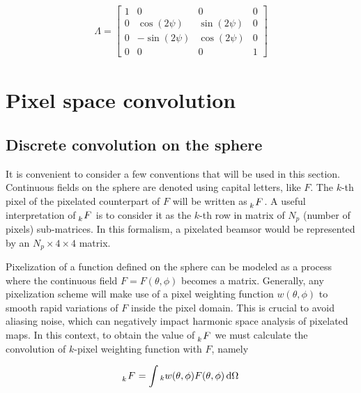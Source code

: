 \documentclass[a4paper,fleqn]{cas-dc}\sloppy
\begin{document}
	\begin{equation}
	\begin{aligned}
	\Lambda =
	\begin{bmatrix}
	1  & 0 & 0 & 0\\
	0  & \cos(2\psi) & \sin(2\psi) & 0\\
	0  &-\sin(2\psi) & \cos(2\psi) & 0\\
	0  & 0 & 0 & 1
	\end{bmatrix}
	\end{aligned}
	\label{eq::lambda_operator}
	\end{equation}
	
	\section{Pixel space convolution}
	\label{sec::pixel_conv}
	
	\subsection{Discrete convolution on the sphere}
	
	It is convenient to consider a few conventions that will be used in this section. Continuous fields on the sphere are denoted using capital letters, like $F$. The $k$-th pixel of the pixelated counterpart of $F$ will be written as $\tensor[_k]{F}{}$. A useful interpretation of $\tensor[_k]{F}{}$ is to consider it as the $k$-th row in matrix of $N_p$ (number of pixels) sub-matrices. In this formalism, a pixelated beamsor would be represented by an $N_p \times 4 \times 4$ matrix.
	
	Pixelization of a function defined on the sphere can be modeled as a process where the continuous field $F = F(\theta,\phi)$ becomes a matrix. Generally, any pixelization scheme will make use of a pixel weighting function $w(\theta,\phi)$ to smooth rapid variations of $F$ inside the pixel domain. This is crucial to avoid aliasing noise, which can negatively impact harmonic space analysis of pixelated maps. In this context, to obtain the value of $\tensor[_k]{F}{}$ we must calculate the convolution of $k$-pixel weighting function with $F$, namely 
	
	\begin{equation}
	\begin{aligned}
	\tensor[_k]{F}{} = \int {}_k w (\theta,\phi) F(\theta,\phi) \, \mathrm{d} \Omega
	\end{aligned}
	\label{eq::howtopixelate}
	\end{equation}
	
\end{document}
